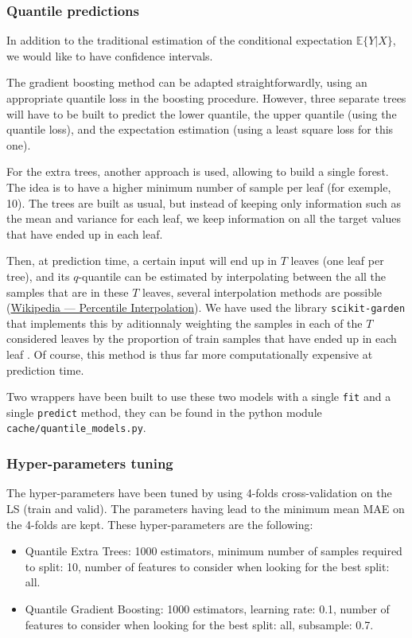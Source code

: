 \documentclass[a4paper, 12pt]{article}
\begin{document}
	\subsubsection{Quantile predictions}

	In addition to the traditional estimation of the conditional expectation $\mathbb{E}\{Y|X\}$, we would like to have confidence intervals. 

	The gradient boosting method can be adapted straightforwardly, using an appropriate quantile loss in the boosting procedure. However, three separate trees will have to be built to predict the lower quantile, the upper quantile (using the quantile loss), and the expectation estimation (using a least square loss for this one).

	For the extra trees, another approach is used, allowing to build a single forest. The idea is to have a higher minimum number of sample per leaf (for exemple, 10). The trees are built as usual, but instead of keeping only information such as the mean and variance for each leaf, we keep information on all the target values that have ended up in each leaf. 

	Then, at prediction time, a certain input will end up in $T$ leaves (one leaf per tree), and its $q$-quantile can be estimated by interpolating between the all the samples that are in these $T$ leaves, several interpolation methods are possible (\href{https://en.wikipedia.org/wiki/Percentile#The_linear_interpolation_between_closest_ranks_method}{Wikipedia — Percentile Interpolation}). We have used the library \texttt{scikit-garden} that implements this by aditionnaly weighting the samples in each of the $T$ considered leaves by the proportion of train samples that have ended up in each leaf \parencite{meinshausen2006quantile}. Of course, this method is thus far more computationally expensive at prediction time.

	Two wrappers have been built to use these two models with a single \texttt{fit} and a single \texttt{predict} method, they can be found in the python module \texttt{cache/quantile\_models.py}.

	\subsubsection{Hyper-parameters tuning}

	The hyper-parameters have been tuned by using 4-folds cross-validation on the LS (train and valid). The parameters having lead to the minimum mean MAE on the 4-folds are kept. These hyper-parameters are the following:
	\begin{itemize}
		\item Quantile Extra Trees: \num{1 000} estimators, minimum number of samples required to split: \num{10}, number of features to consider when looking for the best split: all.
		\item Quantile Gradient Boosting: \num{1 000} estimators, learning rate: \num{0.1}, number of features to consider when looking for the best split: all, subsample: \num{0.7}.
	\end{itemize}
\end{document}
